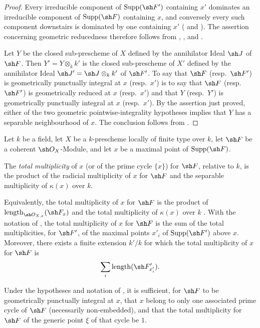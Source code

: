 \begin{proof}
Every irreducible component of $\operatorname{Supp}(\sh F')$
containing $x'$ dominates an irreducible component of
$\operatorname{Supp}(\sh F)$ containing $x$, and conversely every
such component downstairs is dominated by one containing $x'$
( and ).
The assertion concerning geometric reducedness therefore follows
from , , and
.

Let $Y$ be the closed sub-prescheme of $X$ defined by the annihilator
Ideal $\sh J$ of $\sh F$.
Then $Y'=Y\otimes_k k'$ is the closed sub-prescheme of $X'$ defined by
the annihilator Ideal
$\sh J'=\sh J\otimes_k k'$ of $\sh F'$.
To say that $\sh F$ (resp.\ $\sh F'$) is geometrically punctually
integral at $x$ (resp.\ $x'$) is to say that $\sh F$ (resp.\
$\sh F'$) is geometrically reduced at $x$ (resp.\ $x'$) and that
$Y$ (resp.\ $Y'$) is geometrically punctually integral at $x$
(resp.\ $x'$).
By the assertion just proved, either of the two geometric
pointwise-integrality hypotheses implies that $Y$ has a separable
neighbourhood of $x$.
The conclusion follows from .
\end{proof}

\begin{definition}[4.7.12]
\label{IV.4.7.12}
Let $k$ be a field, let $X$ be a $k$-prescheme locally of finite type
over $k$, let $\sh F$ be a coherent $\sh O_X$-Module, and let $x$ be
a maximal point of $\operatorname{Supp}(\sh F)$.

The \emph{total multiplicity} of $x$ (or of the prime cycle
$\overline{\{x\}}$) for $\sh F$, relative to $k$, is the product of
the radicial multiplicity of $x$ for $\sh F$ and the separable
multiplicity of $\kappa(x)$ over $k$.
\end{definition}

Equivalently, the total multiplicity of $x$ for $\sh F$ is the
product of
$\operatorname{length}_{\sh O_{X,x}}(\sh F_x)$ and the total
multiplicity of $\kappa(x)$ over $k$ .
With the notation of , the total multiplicity of $x$
for $\sh F$ is the sum of the total multiplicities, for $\sh F'$, of
the maximal points $x'_i$ of $\operatorname{Supp}(\sh F')$ above $x$.
Moreover, there exists a finite extension $k'/k$ for which the total
multiplicity of $x$ for $\sh F$ is
\[
\sum_i\operatorname{length}(\sh F'_{x'_i}).
\]

\begin{proposition}[4.7.13]
\label{IV.4.7.13}
Under the hypotheses and notation of , it is
sufficient, for $\sh F$ to be geometrically punctually integral at
$x$, that $x$ belong to only one associated prime cycle of $\sh F$
(necessarily non-embedded), and that the total multiplicity for
$\sh F$ of the generic point $\xi$ of that cycle be $1$.
\end{proposition}

